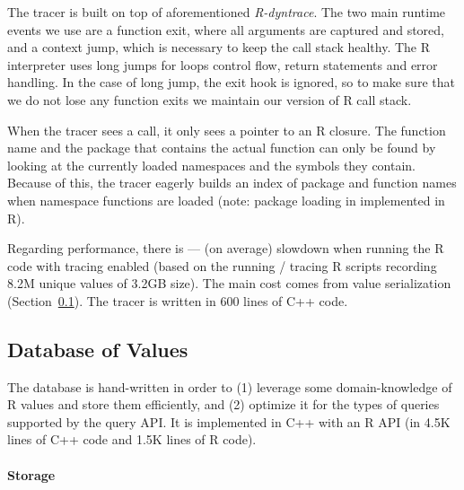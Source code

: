 \documentclass[sigplan,nonacm,anonymous,review]{acmart}
\begin{document}
The tracer is built on top of aforementioned \emph{R-dyntrace}.
The two main runtime events we use are a function exit, where all arguments are captured and stored, and a context jump, which is necessary to keep the call stack healthy.
The R interpreter uses long jumps for loops control flow, return statements and error handling.
In the case of long jump, the exit hook is ignored, so to make sure that we do not lose any function exits we maintain our version of R call stack.

When the tracer sees a call, it only sees a pointer to an R closure.
The function name and the package that contains the actual function can only be found by looking at the currently loaded namespaces and the symbols they contain.
Because of this, the tracer eagerly builds an index of package and function names when namespace functions are loaded (note: package loading in implemented in R).

Regarding performance, there is \TRMinTracingOverhead --- \TRMaxTracingOverhead (\TRAvgTracingOverhead on average) slowdown when running the R code with tracing enabled (based on the running / tracing \TRTracingFiles R scripts recording 8.2M unique values of 3.2GB size).
The main cost comes from value serialization (\Cf Section~\ref{sec:sxpdb}).
The tracer is written in 600 lines of C++ code.

\subsection{Database of Values}\label{sec:sxpdb}

The database is hand-written in order to (1) leverage some domain-knowledge of R values and store them efficiently, and (2) optimize it for the types of queries supported by the query API.
It is implemented in C++ with an R API (in 4.5K lines of C++ code and 1.5K lines of R code).

\paragraph{Storage}
\end{document}
